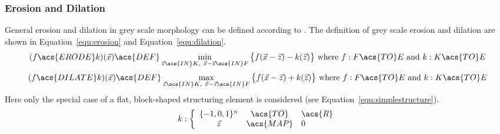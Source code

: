 \documentclass[12pt,a4paper,oneside,openright]{book}
\newcommand{\equ}[1]{Equation~\ref{equ:#1}}
\begin{document}
\begin{CJK}{UTF8}{}
\subsubsection{Erosion and Dilation}\label{cha:greymorph}
General erosion and dilation in grey scale morphology can be defined according to \citet{greymorph}. The definition of grey scale erosion and dilation are shown in \equ{erosion} and \equ{dilation}.
\begin{equation}\label{equ:erosion}
  (f\acs{ERODE} k)(\vec{x})\acs{DEF}\displaystyle\mathop{\operatorname{min}}_{\vec{z}\acs{IN}K\mathrm{,\ }\vec{x}-\vec{z}\acs{IN}F}\big\{f(\vec{x}-\vec{z})-k(\vec{z})\big\}\mathrm{\ where\ }f:F\acs{TO}E\mathrm{\ and\ }k:K\acs{TO}E
\end{equation}
\begin{equation}\label{equ:dilation}
  (f\acs{DILATE} k)(\vec{x})\acs{DEF}\displaystyle\mathop{\operatorname{max}}_{\vec{z}\acs{IN}K\mathrm{,\ }\vec{x}-\vec{z}\acs{IN}F}\big\{f(\vec{x}-\vec{z})+k(\vec{z})\big\}\mathrm{\ where\ }f:F\acs{TO}E\mathrm{\ and\ }k:K\acs{TO}E
\end{equation}
Here only the special case of a flat, block-shaped structuring element is considered (see \equ{simplestructure}).
\begin{equation}\label{equ:simplestructure}
  k:\left\{\begin{array}{ccl}\{-1,0,1\}^n&\acs{TO}&\acs{R}\\\vec{z}&\acs{MAP}&0\end{array}\right.
\end{equation}


\end{CJK}
\end{document}
